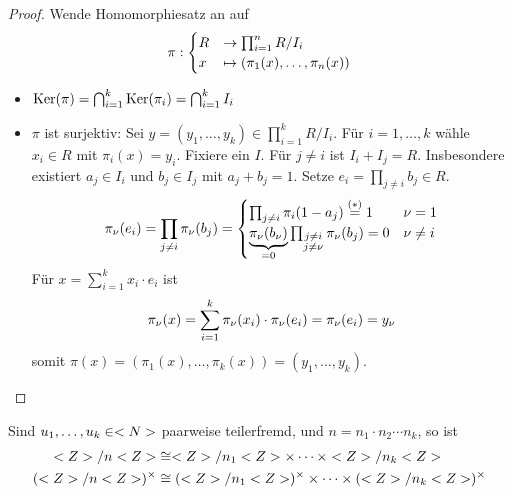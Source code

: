 \begin{proof}
	Wende Homomorphiesatz an auf
	\begin{align}
	\pi: \begin{cases}
	R &\to \prod_{i=1}^{n} R/I_i \\
	x &\mapsto (\pi_1(x), \dots, \pi_n(x))
	\end{cases} \notag
	\end{align}
	\begin{itemize}
		\item $\operatorname{Ker}(\pi) = \bigcap_{i=1}^{k}\operatorname{Ker}(\pi_i) = \bigcap_{i=1}^{k} I_i$
		\item $\pi$ ist surjektiv: Sei $y=(y_1, \dots, y_k) \in \prod_{i=1}^{k} R/I_i$. Für $i = 1,\dots,k$ wähle $x_i \in R$ mit $\pi_i(x) = y_i$. Fixiere ein $I$. Für $j \neq i$ ist $I_i + I_j = R$. Insbesondere existiert $a_j \in I_i$ und $b_j \in I_j$ mit $a_j + b_j = 1$. Setze $e_i = \prod_{j\neq i} b_j \in R$.
		\begin{align}
		\pi_{\nu}(e_i) = \prod_{j \neq i} \pi_{\nu}(b_j) = \begin{cases}
		\prod_{j\neq i} \pi_i(1-a_j) \overset{(\ast)}{=} 1 & \nu = 1\\
		\underbrace{\pi_{\nu}(b_{\nu})}_{=0}\prod_{\substack{j\neq i \\ j \neq \nu}} \pi_{\nu}(b_j) = 0 & \nu \neq i
		\end{cases}\notag %
		\end{align}
		Für $x = \sum_{i=1}^{k}x_i \cdot e_i$ ist 
		\begin{align}
			\pi_{\nu}(x) = \sum_{i=1}^{k} \pi_{\nu}(x_i)\cdot\pi_{\nu}(e_i) = \pi_{\nu}(e_i) = y_{\nu} \notag
		\end{align}
		somit $\pi(x) = (\pi_1(x), \dots, \pi_k(x)) = (y_1, \dots, y_k)$. 
	\end{itemize}
\end{proof}

\begin{conclusion}
	Sind $u_1, \dots, u_k \in <N>$ paarweise teilerfremd, und $n = n_1\cdot n_2 \cdots n_k$, so ist
	\begin{align}
		<Z> / n<Z> &\cong <Z> / n_1 <Z> \times \cdots \times <Z> / n_k <Z> \notag \\
		(<Z> / n<Z>)^{\times} &\cong (<Z> / n_1 <Z>)^{\times} \times \cdots \times (<Z> / n_k <Z>)^{\times} \notag
	\end{align}
\end{conclusion}

